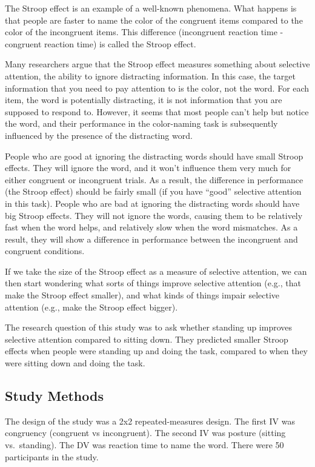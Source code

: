 \documentclass[
]{book}
\begin{document}
The Stroop effect is an example of a well-known phenomena. What happens
is that people are faster to name the color of the congruent items
compared to the color of the incongruent items. This difference
(incongruent reaction time - congruent reaction time) is called the
Stroop effect.

Many researchers argue that the Stroop effect measures something about
selective attention, the ability to ignore distracting information. In
this case, the target information that you need to pay attention to is
the color, not the word. For each item, the word is potentially
distracting, it is not information that you are supposed to respond to.
However, it seems that most people can't help but notice the word, and
their performance in the color-naming task is subsequently influenced by
the presence of the distracting word.

People who are good at ignoring the distracting words should have small
Stroop effects. They will ignore the word, and it won't influence them
very much for either congruent or incongruent trials. As a result, the
difference in performance (the Stroop effect) should be fairly small (if
you have ``good'' selective attention in this task). People who are bad at
ignoring the distracting words should have big Stroop effects. They will
not ignore the words, causing them to be relatively fast when the word
helps, and relatively slow when the word mismatches. As a result, they
will show a difference in performance between the incongruent and
congruent conditions.

If we take the size of the Stroop effect as a measure of selective
attention, we can then start wondering what sorts of things improve
selective attention (e.g., that make the Stroop effect smaller), and
what kinds of things impair selective attention (e.g., make the Stroop
effect bigger).

The research question of this study was to ask whether standing up
improves selective attention compared to sitting down. They predicted
smaller Stroop effects when people were standing up and doing the task,
compared to when they were sitting down and doing the task.

\hypertarget{study-methods-2}{%
\subsection{Study Methods}\label{study-methods-2}}

The design of the study was a 2x2 repeated-measures design. The first IV
was congruency (congruent vs incongruent). The second IV was posture
(sitting vs.~standing). The DV was reaction time to name the word. There
were 50 participants in the study.
\end{document}
